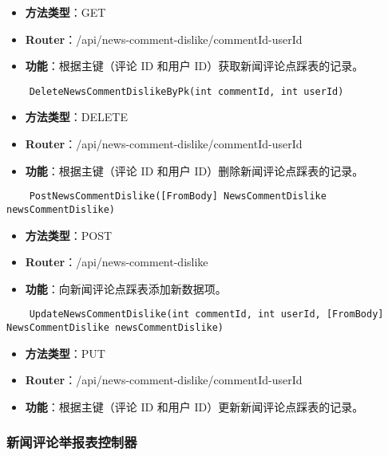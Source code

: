 \begin{itemize}
	\item \textbf{方法类型}：GET
	\item \textbf{Router}：/api/news-comment-dislike/{commentId}-{userId}
	\item \textbf{功能}：根据主键（评论 ID 和用户 ID）获取新闻评论点踩表的记录。
\end{itemize}

\begin{verbatim}
	DeleteNewsCommentDislikeByPk(int commentId, int userId)
\end{verbatim}

\begin{itemize}
	\item \textbf{方法类型}：DELETE
	\item \textbf{Router}：/api/news-comment-dislike/{commentId}-{userId}
	\item \textbf{功能}：根据主键（评论 ID 和用户 ID）删除新闻评论点踩表的记录。
\end{itemize}

\begin{verbatim}
	PostNewsCommentDislike([FromBody] NewsCommentDislike newsCommentDislike)
\end{verbatim}

\begin{itemize}
	\item \textbf{方法类型}：POST
	\item \textbf{Router}：/api/news-comment-dislike
	\item \textbf{功能}：向新闻评论点踩表添加新数据项。
\end{itemize}

\begin{verbatim}
	UpdateNewsCommentDislike(int commentId, int userId, [FromBody] NewsCommentDislike newsCommentDislike)
\end{verbatim}

\begin{itemize}
	\item \textbf{方法类型}：PUT
	\item \textbf{Router}：/api/news-comment-dislike/{commentId}-{userId}
	\item \textbf{功能}：根据主键（评论 ID 和用户 ID）更新新闻评论点踩表的记录。
\end{itemize}

\subsubsection{新闻评论举报表控制器}

